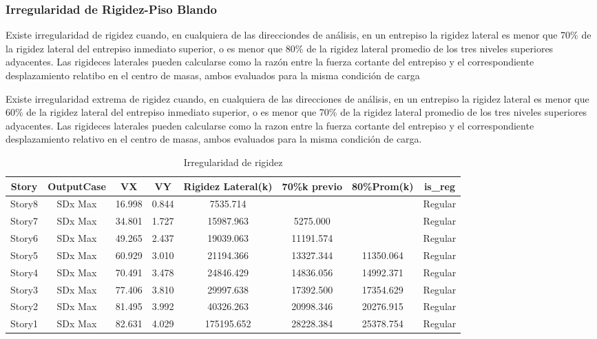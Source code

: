 \documentclass{article}%
\begin{document}
%
\subsubsection{Irregularidad de Rigidez-Piso Blando}%
\label{ssubsec:IrregularidaddeRigidez{-}PisoBlando}%
\begin{tcolorbox}[colback=gray!5!white,colframe=cyan!75!black,fonttitle=\bfseries,title=Tabla N°9 E-030]%
Existe irregularidad de rigidez cuando, en cualquiera de las direcciondes de análisis, en un entrepiso la rigidez lateral es menor que 70\% de la rigidez lateral del entrepiso inmediato superior, o es menor que 80\% de la rigidez lateral promedio de los tres niveles superiores adyacentes. 
 Las rigideces laterales pueden calcularse como la razón entre la fuerza cortante del entrepiso y el correspondiente desplazamiento relatibo en el centro de masas, ambos evaluados para la misma condición de carga %
\end{tcolorbox}%
\begin{tcolorbox}[colback=gray!5!white,colframe=cyan!75!black,fonttitle=\bfseries,title=Tabla N°9 E-030]%

Existe irregularidad extrema de rigidez cuando, en cualquiera de las direcciones de análisis, en un entrepiso la rigidez lateral es menor que 60\% de la rigidez lateral del entrepiso inmediato superior, o es menor que 70\% de la rigidez lateral promedio de los tres niveles superiores adyacentes.
Las rigideces laterales pueden calcularse como la razon entre la fuerza cortante del entrepiso y el correspondiente desplazamiento relativo en el centro de masas, ambos evaluados para la misma condición de carga.%
\end{tcolorbox}%


\begin{table}[h!]%
\centering%
\caption{Irregularidad de rigidez}%
\begin{tabular}{cccccccc}
\toprule
Story & OutputCase & VX & VY & Rigidez Lateral(k) & 70\%k previo & 80\%Prom(k) & is\_reg \\
\midrule
Story8 & SDx Max & 16.998 & 0.844 & 7535.714 &  &  & Regular \\
Story7 & SDx Max & 34.801 & 1.727 & 15987.963 & 5275.000 &  & Regular \\
Story6 & SDx Max & 49.265 & 2.437 & 19039.063 & 11191.574 &  & Regular \\
Story5 & SDx Max & 60.929 & 3.010 & 21194.366 & 13327.344 & 11350.064 & Regular \\
Story4 & SDx Max & 70.491 & 3.478 & 24846.429 & 14836.056 & 14992.371 & Regular \\
Story3 & SDx Max & 77.406 & 3.810 & 29997.638 & 17392.500 & 17354.629 & Regular \\
Story2 & SDx Max & 81.495 & 3.992 & 40326.263 & 20998.346 & 20276.915 & Regular \\
Story1 & SDx Max & 82.631 & 4.029 & 175195.652 & 28228.384 & 25378.754 & Regular \\
\bottomrule
\end{tabular}
%
\end{table}
\end{document}
